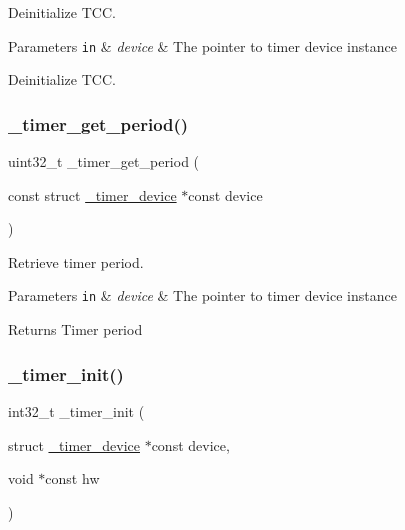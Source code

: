 Deinitialize T\+CC. 


\begin{DoxyParams}[1]{Parameters}
\mbox{\tt in}  & {\em device} & The pointer to timer device instance\\
\hline
\end{DoxyParams}
Deinitialize T\+CC. \mbox{\label{group___h_p_l_ga7dcd9a3f656643075605cbdd19bb1dc3}} 
\subsubsection{\texorpdfstring{\+\_\+timer\+\_\+get\+\_\+period()}{\_timer\_get\_period()}}
{\footnotesize\ttfamily uint32\+\_\+t \+\_\+timer\+\_\+get\+\_\+period (\begin{DoxyParamCaption}\item[{const struct \hyperlink{struct__timer__device}{\+\_\+timer\+\_\+device} $\ast$const}]{device }\end{DoxyParamCaption})}



Retrieve timer period. 


\begin{DoxyParams}[1]{Parameters}
\mbox{\tt in}  & {\em device} & The pointer to timer device instance\\
\hline
\end{DoxyParams}
\begin{DoxyReturn}{Returns}
Timer period 
\end{DoxyReturn}
\mbox{\label{group___h_p_l_gade39b65e851877482435cfb3789724a8}} 
\subsubsection{\texorpdfstring{\+\_\+timer\+\_\+init()}{\_timer\_init()}}
{\footnotesize\ttfamily int32\+\_\+t \+\_\+timer\+\_\+init (\begin{DoxyParamCaption}\item[{struct \hyperlink{struct__timer__device}{\+\_\+timer\+\_\+device} $\ast$const}]{device,  }\item[{void $\ast$const}]{hw }\end{DoxyParamCaption})}




